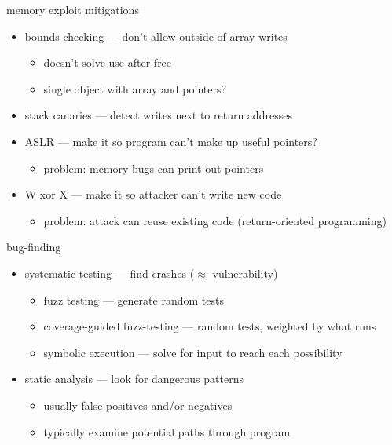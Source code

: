 \begin{frame}{memory exploit mitigations}
    \begin{itemize}
        \item bounds-checking --- don't allow outside-of-array writes
            \begin{itemize}
            \item doesn't solve use-after-free
            \item single object with array and pointers?
            \end{itemize}
        \item stack canaries --- detect writes next to return addresses
        \item ASLR --- make it so program can't make up useful pointers?
            \begin{itemize}
            \item problem: memory bugs can print out pointers
            \end{itemize}
        \item W xor X --- make it so attacker can't write new code
            \begin{itemize}
            \item problem: attack can reuse existing code (return-oriented programming)
            \end{itemize}
    \end{itemize}
\end{frame}

\begin{frame}{bug-finding}
    \begin{itemize}
        \item systematic testing --- find crashes ($\approx$ vulnerability)
            \begin{itemize}
            \item fuzz testing --- generate random tests
            \item coverage-guided fuzz-testing --- random tests, weighted by what runs
            \item symbolic execution --- solve for input to reach each possibility
            \end{itemize}
        \item static analysis --- look for dangerous patterns
            \begin{itemize}
            \item usually false positives and/or negatives
            \item typically examine potential paths through program
            \end{itemize}
    \end{itemize}
\end{frame}

